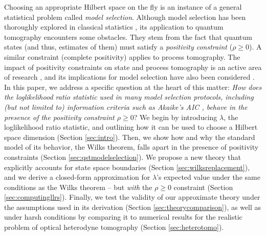 \documentclass[aps,pra, twocolumn]{revtex4-1}
\begin{document}
Choosing an appropriate Hilbert space on the fly is an instance of a general statistical problem called \emph{model selection}.  Although model selection has been thoroughly explored in classical statistics \cite{Burnham2004}, its application to quantum tomography encounters some obstacles.  They stem from the fact that quantum states (and thus, estimates of them) must satisfy a \emph{positivity constraint} ($\rho\geq0$).  A similar constraint (complete positivity) applies to process tomography.  The impact of positivity constraints on state and process tomography is an active area of research \cite{Candes2006, Flammia2012a, Suess2016, Carpentier2015}, and its implications for model selection have also been considered \cite{Schwarz2013a, Guta2012a, VanEnk2013a, Langford2013, Yin2011, Moroder2013, Knips2015}.  In this paper, we address a specific question at the heart of this matter:  \emph{How does the loglikelihood ratio statistic used in many model selection protocols, including (but not limited to) information criteria such as Akaike's AIC \cite{Akaike1974}, behave in the presence of the positivity constraint $\rho\geq0$}?  We begin by introducing $\lambda$, the loglikelihood ratio statistic, and outlining how it can be used to choose a Hilbert space dimension (Section \ref{sec:intro}).  Then, we show how and why the standard model of its behavior, the Wilks theorem, falls apart in the presence of positivity constraints (Section \ref{sec:qstmodelselection}).  We propose a new theory that explicitly accounts for state space boundaries (Section \ref{sec:wilksreplacement}), and we derive a closed-form approximation for $\lambda$'s expected value under the same conditions as the Wilks theorem -- but \emph{with} the $\rho\geq0$ constraint (Section \ref{sec:computingllrs}).  Finally, we test the validity of our approximate theory under the assumptions used in its derivation (Section \ref{sec:theorycomparison}), as well as under harsh conditions by comparing it to numerical results for the realistic problem of optical heterodyne tomography (Section \ref{sec:heterotomo}).
\end{document}
